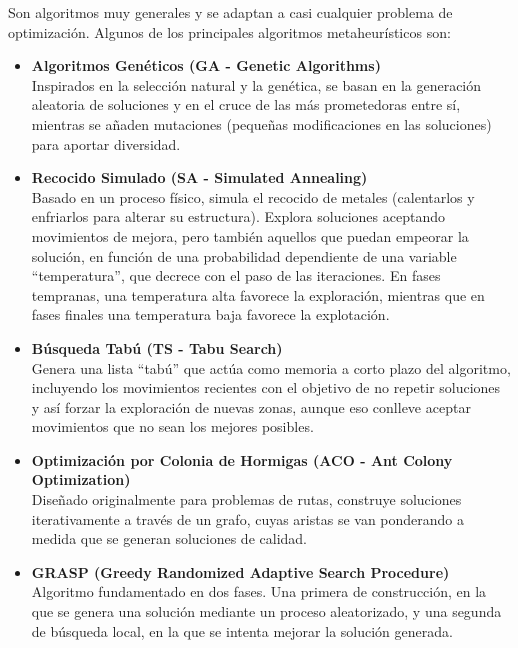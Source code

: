 \documentclass[12pt,a4paper]{book}
\begin{document}
Son algoritmos muy generales y se adaptan a casi cualquier problema de optimización. Algunos de los principales algoritmos metaheurísticos son:
\begin{itemize}
    \item \textbf{Algoritmos Genéticos (GA - Genetic Algorithms)}\\
    Inspirados en la selección natural y la genética, se basan en la generación aleatoria de soluciones y en el cruce de las más prometedoras entre sí, 
    mientras se añaden mutaciones (pequeñas modificaciones en las soluciones) para aportar diversidad.
    
    \item \textbf{Recocido Simulado (SA - Simulated Annealing)}\\
    Basado en un proceso físico, simula el recocido de metales (calentarlos y enfriarlos para alterar su estructura). Explora soluciones aceptando movimientos de mejora, pero también aquellos que puedan empeorar la solución, 
    en función de una probabilidad dependiente de una variable ``temperatura'', que decrece con el paso de las iteraciones. En fases tempranas, una temperatura alta favorece la exploración, mientras que en fases finales una temperatura baja favorece la explotación.
    
    \item \textbf{Búsqueda Tabú (TS - Tabu Search)}\\
    Genera una lista ``tabú'' que actúa como memoria a corto plazo del algoritmo, incluyendo los movimientos recientes con el objetivo de no repetir soluciones y así forzar la exploración de nuevas zonas, aunque eso conlleve aceptar movimientos que no sean los mejores posibles.
    
    \item \textbf{Optimización por Colonia de Hormigas (ACO - Ant Colony Optimization)}\\
    Diseñado originalmente para problemas de rutas, construye soluciones iterativamente a través de un grafo, cuyas aristas se van ponderando a medida que se generan soluciones de calidad.
    
    \item \textbf{GRASP (Greedy Randomized Adaptive Search Procedure)}\\
    Algoritmo fundamentado en dos fases. Una primera de construcción, en la que se genera una solución mediante un proceso aleatorizado, y una segunda de búsqueda local, en la que se intenta mejorar la solución generada.
\end{itemize}
\end{document}
